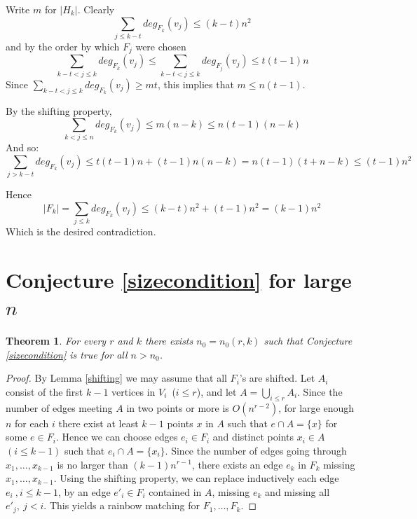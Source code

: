 \documentclass{amsart}
\newtheorem{theorem}{Theorem}[section]
\theoremstyle{remark}
\begin{document}
 Write $m$ for  $|H_k|$. Clearly $$ \sum_{j \le k-t}deg_{F_k}(v_j) \le (k-t)n^2$$ and by the order by which $F_j$ were chosen
$$ \sum_{k-t <j \le k}deg_{F_k}(v_j) \le
\sum_{k-t <j \le k} deg_{F_j}(v_j)\le t(t-1)n$$
Since $\sum_{k-t <j \le k}deg_{F_k}(v_j) \ge mt$, this implies that $m \le n(t-1)$.

By the shifting property, $$\sum_{k <j \le n} deg_{F_k}(v_j)\le m(n-k)\le n(t-1)(n-k)$$
And so: $$\sum_{j>k-t}deg_{F_k}(v_j) \le t(t-1)n+(t-1)n(n-k)=n(t-1)(t+n-k)\le (t-1)n^2$$

Hence $$|F_k|=\sum_{j \le k}deg_{F_k}(v_j)\le (k-t)n^2+(t-1)n^2=(k-1)n^2$$
Which is the desired contradiction.





\section{Conjecture \ref{sizecondition} for large $n$}

\begin{theorem}
For every $r$ and $k$ there exists $n_0=n_0(r,k)$ such that Conjecture \ref{sizecondition} is true for all $n>n_0$.
\end{theorem}

\begin{proof}
By Lemma \ref{shifting} we may assume that all $F_i$'s are shifted.
Let $A_i$ consist of the first $k-1$ vertices in $V_i$~($i \le r$), and let $A =\bigcup_{i\le r}A_i$. Since the number of edges
meeting $A$ in two points or more is $O(n^{r-2})$, for large enough $n$
for each $i$ there exist at least $k-1$ points $x$ in $A$ such that $e \cap A=\{x\}$ for some $e \in F_i$. Hence we can choose edges
 $e_i \in F_i$ and distinct  points $x_i \in A$ ~$(i \le k-1)$ such that $e_i \cap A =\{x_i\}$.
 Since the number of edges going through $x_1,\ldots,x_{k-1}$ is no larger than $(k-1)n^{r-1}$,
 there exists an edge $e_k$ in $F_k$ missing $x_1,\ldots,x_{k-1}$. Using the shifting property,
  we can replace inductively each edge $e_i~, i\le k-1$, by an edge $e'_i\in F_i$ contained in
  $A$,  missing $e_k$ and missing all $e'_j,~j<i$. This yields a rainbow matching for $F_1, \ldots, F_k$.
\end{proof}
\end{document}
